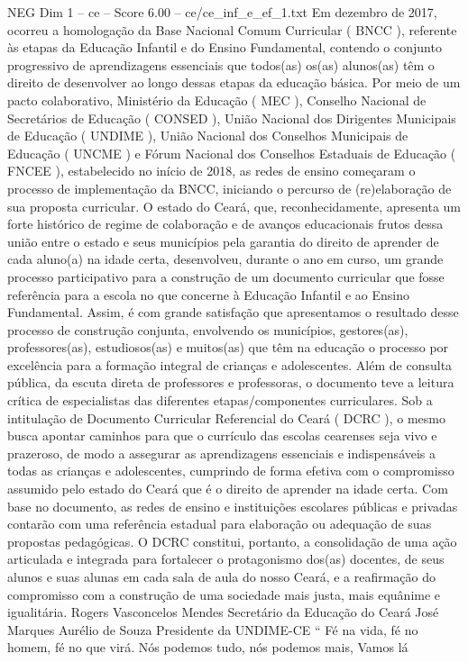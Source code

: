 \begin{textsample}{NEG Dim 1 – ce – Score 6.00 – ce/ce\_inf\_e\_ef\_1.txt}  \label{ex:f1_neg_249}
Em dezembro de 2017, ocorreu a homologação da Base Nacional Comum Curricular ( BNCC ), referente às etapas da Educação Infantil e do Ensino Fundamental, contendo o conjunto progressivo de aprendizagens essenciais que todos(as) os(as) alunos(as) têm o direito de desenvolver ao longo dessas etapas da educação básica.
Por meio de um pacto colaborativo, Ministério da Educação ( MEC ), Conselho Nacional de Secretários de Educação ( CONSED ), União Nacional dos Dirigentes Municipais de Educação ( UNDIME ), União Nacional dos Conselhos Municipais de Educação ( UNCME ) e Fórum Nacional dos Conselhos Estaduais de Educação ( FNCEE ), estabelecido no início de 2018, as redes de ensino começaram o processo de implementação da BNCC, iniciando o percurso de (re)elaboração de sua proposta curricular.
O estado do Ceará, que, reconhecidamente, apresenta um forte histórico de regime de colaboração e de avanços educacionais frutos dessa união entre o estado e seus municípios pela garantia do direito de aprender de cada aluno(a) na idade certa, desenvolveu, durante o ano em curso, um grande processo participativo para a construção de um documento curricular que fosse referência para a escola no que concerne à Educação Infantil e ao Ensino Fundamental.
Assim, é com grande satisfação que apresentamos o resultado desse processo de construção conjunta, envolvendo os municípios, gestores(as), professores(as), estudiosos(as) e muitos(as) que têm na educação o processo por excelência para a formação integral de crianças e adolescentes.
Além de consulta pública, da escuta direta de professores e professoras, o documento teve a leitura crítica de especialistas das diferentes etapas/componentes curriculares.
Sob a intitulação de Documento Curricular Referencial do Ceará ( DCRC ), o mesmo busca apontar caminhos para que o currículo das escolas cearenses seja vivo e prazeroso, de modo a assegurar as aprendizagens essenciais e indispensáveis a todas as crianças e adolescentes, cumprindo de forma efetiva com o compromisso assumido pelo estado do Ceará que é o direito de aprender na idade certa.
Com base no documento, as redes de ensino e instituições escolares públicas e privadas contarão com uma referência estadual para elaboração ou adequação de suas propostas pedagógicas.
O DCRC constitui, portanto, a consolidação de uma ação articulada e integrada para fortalecer o protagonismo dos(as) docentes, de seus alunos e suas alunas em cada sala de aula do nosso Ceará, e a reafirmação do compromisso com a construção de uma sociedade mais justa, mais equânime e igualitária.
Rogers Vasconcelos Mendes Secretário da Educação do Ceará José Marques Aurélio de Souza Presidente da UNDIME-CE “ Fé na vida, fé no homem, fé no que virá.
Nós podemos tudo, nós podemos mais, Vamos lá

\end{textsample}
